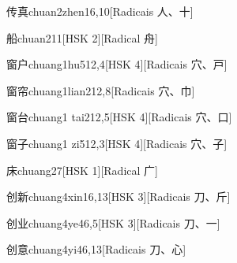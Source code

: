 \begin{entry}{传真}{chuan2zhen1}{6,10}[Radicais ⼈、⼗]
\end{entry}

\begin{entry}{船}{chuan2}{11}[HSK 2][Radical ⾈]
\end{entry}

\begin{entry}{窗户}{chuang1hu5}{12,4}[HSK 4][Radicais ⽳、⼾]
\end{entry}

\begin{entry}{窗帘}{chuang1lian2}{12,8}[Radicais ⽳、⼱]
\end{entry}

\begin{entry}{窗台}{chuang1 tai2}{12,5}[HSK 4][Radicais ⽳、⼝]
\end{entry}

\begin{entry}{窗子}{chuang1 zi5}{12,3}[HSK 4][Radicais ⽳、⼦]
\end{entry}

\begin{entry}{床}{chuang2}{7}[HSK 1][Radical ⼴]
\end{entry}

\begin{entry}{创新}{chuang4xin1}{6,13}[HSK 3][Radicais ⼑、⽄]
\end{entry}

\begin{entry}{创业}{chuang4ye4}{6,5}[HSK 3][Radicais ⼑、⼀]
\end{entry}

\begin{entry}{创意}{chuang4yi4}{6,13}[Radicais ⼑、⼼]
\end{entry}

